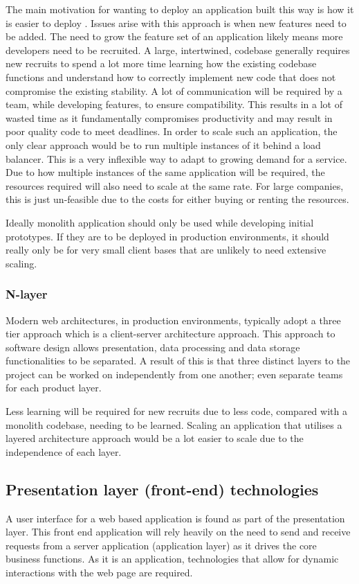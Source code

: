 The main motivation for wanting to deploy an application built this way is how it is easier to deploy \cite{namiot2014micro}.
Issues arise with this approach is when new features need to be added. The need to grow the feature set of an application likely means
more developers need to be recruited. A large, intertwined, codebase generally requires new recruits to spend a lot more time learning
how the existing codebase functions and understand how to correctly implement new code that does not compromise the existing stability.
A lot of communication will be required by a team, while developing features, to ensure compatibility.
This results in a lot of wasted time as it fundamentally compromises productivity and may result in poor quality code to meet deadlines.
In order to scale such an application, the only clear approach would be to run multiple instances of it behind a load balancer.
This is a very inflexible way to adapt to growing demand for a service.
Due to how multiple instances of the same application will be required, the resources required will also need to scale at the same rate.
For large companies, this is just un-feasible due to the costs for either buying or renting the resources. 

Ideally monolith application should only be used while developing initial prototypes. If they are to be deployed in production environments,
it should really only be for very small client bases that are unlikely to need extensive scaling.

\subsubsection{N-layer} \label{nlayer}

Modern web architectures, in production environments, typically adopt a three tier approach which is a client-server architecture approach.
This approach to software design allows presentation, data processing and data storage functionalities to be separated.
A result of this is that three distinct layers to the project can be worked on independently from one another; even separate teams for
each product layer. 

Less learning will be required for new recruits due to less code, compared with a monolith codebase, needing to be learned.
Scaling an application that utilises a layered architecture approach would be a lot easier to scale due to the independence of each layer.

\subsection{Presentation layer (front-end) technologies}
A user interface for a web based application is found as part of the presentation layer.
This front end application will rely heavily on the need to send and receive requests from a server application (application layer) as 
it drives the core business functions.
As it is an application, technologies that allow for dynamic interactions with the web page are required.

